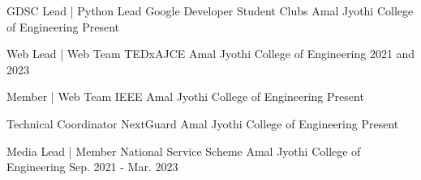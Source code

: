 \begin{cventries}
  \cventry
    {GDSC Lead | Python Lead} %
    {Google Developer Student Clubs} %
    {Amal Jyothi College of Engineering}
    {Present} %
    {}
\end{cventries}
\vspace{-1.5\baselineskip}
\begin{cventries}
  \cventry
    {Web Lead | Web Team} %
    {TEDxAJCE} %
    {Amal Jyothi College of Engineering}
    {2021 and 2023} %
    {}
\end{cventries}
\vspace{-1.5\baselineskip}
\begin{cventries}
  \cventry
    {Member | Web Team} %
    {IEEE} %
    {Amal Jyothi College of Engineering}
    {Present} %
    {}
\end{cventries}
\vspace{-1.5\baselineskip}
\begin{cventries}
  \cventry
    {Technical Coordinator} %
    {NextGuard} %
    {Amal Jyothi College of Engineering}
    {Present} %
    {}
\end{cventries}
\vspace{-1.5\baselineskip}
\begin{cventries}
  \cventry
    {Media Lead | Member} %
    {National Service Scheme} %
    {Amal Jyothi College of Engineering}
    {Sep. 2021 - Mar. 2023} %
    {}
\end{cventries}